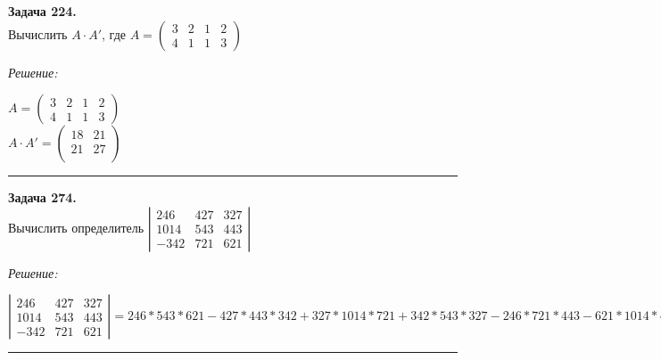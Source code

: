 \documentclass[a4paper, 12pt]{article}
\newenvironment{problem}[2][Задача]
    { \begin{mdframed}[backgroundcolor=gray!10] \textbf{#1 #2.} \\}
    {  \end{mdframed}}
\newenvironment{solution}
    {\textit{Решение: }}
    {\noindent\rule{7in}{1.5pt}}
\begin{document}
\begin{problem}{224}
Вычислить $A\cdot A'$, где $A=\left( \begin{array}{cccc}3 & 2 & 1& 2\\4 & 1 & 1 & 3 \end{array} \right)$
\end{problem}
\begin{solution}

$A=\left( \begin{array}{cccc}3 & 2 & 1& 2\\4 & 1 & 1 & 3 \end{array} \right)$ \\
$
A \cdot A'
=
\left(
  \begin{array}{rr}
    18 & 21 \\
    21 & 27 \\
  \end{array}
\right)
$

\end{solution}

\begin{problem}{274}
Вычислить определитель $\left| \begin{array}{rrr}246 & 427 & 327 \\ 1014 & 543 & 443 \\ -342 & 721 & 621 \end{array} \right|$
\end{problem}
\begin{solution}

$
\left|
\begin{array}{rrr}
  246 & 427 & 327 \\
  1014 & 543 & 443 \\
  -342 & 721 & 621
\end{array}
\right|
=
246*543*621 - 427*443*342 + 327*1014*721 + 342*543*327 - 246*721*443 - 621*1014*427 =
-29400000
$

\end{solution}
\end{document}
